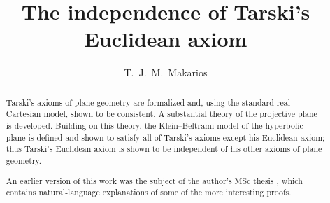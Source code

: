 \documentclass[11pt,a4paper]{article}
\begin{document}
\title{The independence of Tarski's Euclidean axiom}
\author{T.~J.~M.~Makarios}
\maketitle

\begin{abstract}
Tarski's axioms of plane geometry are formalized and, using the standard real Cartesian model, shown to be consistent.
A substantial theory of the projective plane is developed.
Building on this theory, the Klein--Beltrami model of the hyperbolic plane is defined and shown to satisfy all of Tarski's axioms except his Euclidean axiom;
thus Tarski's Euclidean axiom is shown to be independent of his other axioms of plane geometry.

An earlier version of this work was the subject of the author's MSc thesis \cite{makarios}, which contains natural-language explanations of some of the more interesting proofs.
\end{abstract}

\tableofcontents





\end{document}
